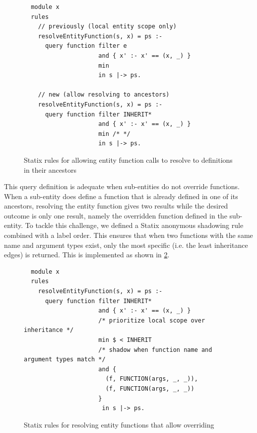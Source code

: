       \begin{figure}
        \begin{verbatim}
  module x
  rules
    // previously (local entity scope only)
    resolveEntityFunction(s, x) = ps :-
      query function filter e
                     and { x' :- x' == (x, _) }
                     min
                     in s |-> ps.

    // new (allow resolving to ancestors)
    resolveEntityFunction(s, x) = ps :-
      query function filter INHERIT*
                     and { x' :- x' == (x, _) }
                     min /* */
                     in s |-> ps.
        \end{verbatim}
        \caption{\label{fig:entity-function-resolve-old}Statix rules for allowing entity function calls to resolve to definitions in their ancestors}
      \end{figure}


      This query definition is adequate when sub-entities do not override functions. When a sub-entity does define a function that is already defined in one of its ancestors, resolving the entity function gives two results while the desired outcome is only one result, namely the overridden function defined in the sub-entity. To tackle this challenge, we defined a Statix anonymous shadowing rule combined with a label order. This ensures that when two functions with the same name and argument types exist, only the most specific (i.e. the least inheritance edges) is returned. This is implemented as shown in \cref{fig:entity-function-resolve-with-overriding}.

      \begin{figure}
        \begin{verbatim}
  module x
  rules
    resolveEntityFunction(s, x) = ps :-
      query function filter INHERIT*
                     and { x' :- x' == (x, _) }
                     /* prioritize local scope over inheritance */
                     min $ < INHERIT
                     /* shadow when function name and argument types match */
                     and {
                       (f, FUNCTION(args, _, _)),
                       (f, FUNCTION(args, _, _))
                     }
                      in s |-> ps.
        \end{verbatim}
        \caption{\label{fig:entity-function-resolve-with-overriding}Statix rules for resolving entity functions that allow overriding}
      \end{figure}

